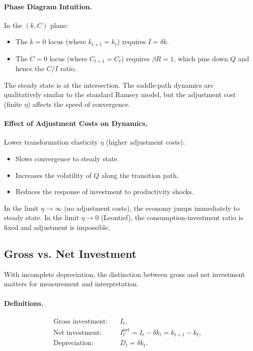 \paragraph{Phase Diagram Intuition.}
In the $(k, C)$ plane:
\begin{itemize}[nosep]
\item The $\dot{k} = 0$ locus (where $k_{t+1} = k_t$) requires $I = \delta k$.
\item The $\dot{C} = 0$ locus (where $C_{t+1} = C_t$) requires $\beta R = 1$, which pins down $Q$ and hence the $C/I$ ratio.
\end{itemize}

The steady state is at the intersection. The saddle-path dynamics are qualitatively similar to the standard Ramsey model, but the adjustment cost (finite $\eta$) affects the speed of convergence.

\paragraph{Effect of Adjustment Costs on Dynamics.}
Lower transformation elasticity $\eta$ (higher adjustment costs):
\begin{itemize}[nosep]
\item Slows convergence to steady state.
\item Increases the volatility of $Q$ along the transition path.
\item Reduces the response of investment to productivity shocks.
\end{itemize}

In the limit $\eta \to \infty$ (no adjustment costs), the economy jumps immediately to steady state. In the limit $\eta \to 0$ (Leontief), the consumption-investment ratio is fixed and adjustment is impossible.

\subsection{Gross vs. Net Investment}
\label{subsec:ac-dep-gross-net}

With incomplete depreciation, the distinction between gross and net investment matters for measurement and interpretation.

\paragraph{Definitions.}
\begin{align}
\text{Gross investment:} & \quad I_t, \\
\text{Net investment:} & \quad I_t^{\text{net}} = I_t - \delta k_t = k_{t+1} - k_t, \\
\text{Depreciation:} & \quad D_t = \delta k_t.
\end{align}

